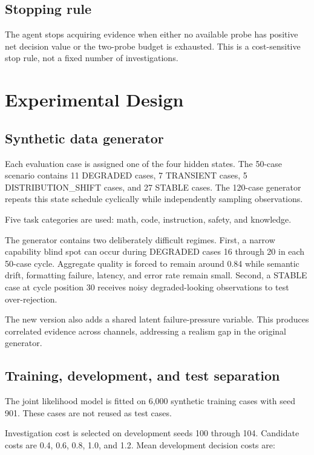 \documentclass{article}
\begin{document}
\subsection{Stopping rule}

The agent stops acquiring evidence when either no available probe has positive net decision value or the two-probe budget is exhausted. This is a cost-sensitive stop rule, not a fixed number of investigations.

\section{Experimental Design}

\subsection{Synthetic data generator}

Each evaluation case is assigned one of the four hidden states. The 50-case scenario contains 11 DEGRADED cases, 7 TRANSIENT cases, 5 DISTRIBUTION\_SHIFT cases, and 27 STABLE cases. The 120-case generator repeats this state schedule cyclically while independently sampling observations.

Five task categories are used: math, code, instruction, safety, and knowledge.

The generator contains two deliberately difficult regimes. First, a narrow capability blind spot can occur during DEGRADED cases 16 through 20 in each 50-case cycle. Aggregate quality is forced to remain around 0.84 while semantic drift, formatting failure, latency, and error rate remain small. Second, a STABLE case at cycle position 30 receives noisy degraded-looking observations to test over-rejection.

The new version also adds a shared latent failure-pressure variable. This produces correlated evidence across channels, addressing a realism gap in the original generator.

\subsection{Training, development, and test separation}

The joint likelihood model is fitted on 6,000 synthetic training cases with seed 901. These cases are not reused as test cases.

Investigation cost is selected on development seeds 100 through 104. Candidate costs are 0.4, 0.6, 0.8, 1.0, and 1.2. Mean development decision costs are:
\end{document}
